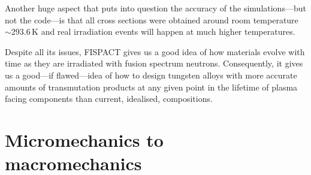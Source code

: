 \documentclass[12pt, a4paper]{article}
\begin{document}
		Another huge aspect that puts into question the accuracy of the simulations---but not the code---is that all cross sections were obtained around room temperature $\sim 293.6\,\textrm{K}$ and real irradiation events will happen at much higher temperatures.
		
		Despite all its issues, FISPACT gives us a good idea of how materials evolve with time as they are irradiated with fusion spectrum neutrons. Consequently, it gives us a good---if flawed---idea of how to design tungsten alloys with more accurate amounts of transmutation products at any given point in the lifetime of plasma facing components than current, idealised, compositions.
		\section{Micromechanics to macromechanics}\label{s:mm}
		
	
\end{document}
